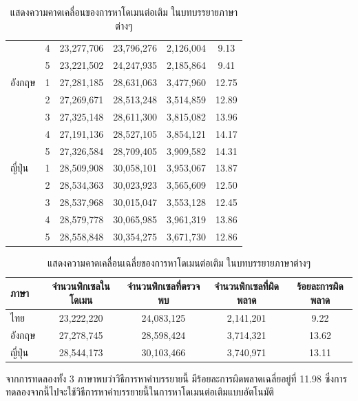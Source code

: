 \documentclass[hidelinks, a4paper,12pt]{article}
\numberwithin{equation}{section}							%
\numberwithin{equation}{section}
\begin{document}
{\begin{table}[H]
\begin{tabular}[ht]{|l|c|c|c|c|c|}
				& 4 & 23,277,706 & 23,796,276  & 2,126,004 & 9.13\\
				& 5 & 23,221,502 & 24,247,935 & 2,185,864 & 9.41\\
			\hline
			อังกฤษ & 1 & 27,281,185 & 28,631,063 & 3,477,960  & 12.75\\
			& 2 & 27,269,671 & 28,513,248 & 3,514,859 & 12.89\\
			& 3 & 27,325,148 & 28,611,300 & 3,815,082 & 13.96\\
			& 4 & 27,191,136 & 28,527,105 & 3,854,121 & 14.17\\
			& 5 & 27,326,584 & 28,709,405 & 3,909,582 & 14.31\\
			\hline
			ญี่ปุ่น & 1 & 28,509,908 & 30,058,101 &  3,953,067 & 13.87\\
			& 2 & 28,534,363  & 30,023,923 & 3,565,609 & 12.50\\
			& 3 & 28,537,968 & 30,015,047 & 3,553,128 & 12.45\\
			& 4 & 28,579,778 & 30,065,985 & 3,961,319 & 13.86\\
			& 5 & 28,558,848 & 30,354,275 & 3,671,730 & 12.86\\
			\hline
		\end{tabular}
		\caption{แสดงความคาดเคลื่อนของการหาโดเมนต่อเติม ในบทบรรยายภาษาต่างๆ}
	\end{table}
	\begin{table}[H]
		\centering
			\footnotesize
		\begin{tabular}[ht]{|l|c|c|c|c|}
			\hline
			ภาษา  & จำนวนพิกเซลในโดเมน & จำนวนพิกเซลที่ตรวจพบ & จำนวนพิกเซลที่ผิดพลาด & ร้อยละการผิดพลาด \\
			\hline
			ไทย & 23,222,220 & 24,083,125 & 2,141,201 & 9.22 \\
			อังกฤษ & 27,278,745 & 28,598,424 & 3,714,321 & 13.62 \\
			ญี่ปุ่น & 28,544,173 & 30,103,466 & 3,740,971 & 13.11 \\
			\hline
		\end{tabular}
		\caption{แสดงความคาดเคลื่อนเฉลี่ยของการหาโดเมนต่อเติม ในบทบรรยายภาษาต่างๆ}
	\end{table}	
	
	\hspace{1cm} จากการทดลองทั้ง  3 ภาษาพบว่าวิธีการหาคำบรรยายนี้ มีร้อยละการผิดพลาดเฉลี่ยอยู่ที่ 11.98 ซึ่งการทดลองจากนี้ไปจะใช้วิธีการหาคำบรรยายนี้ในการหาโดเมนต่อเติมแบบอัตโนมัติ
	\clearpage
}
\end{document}
